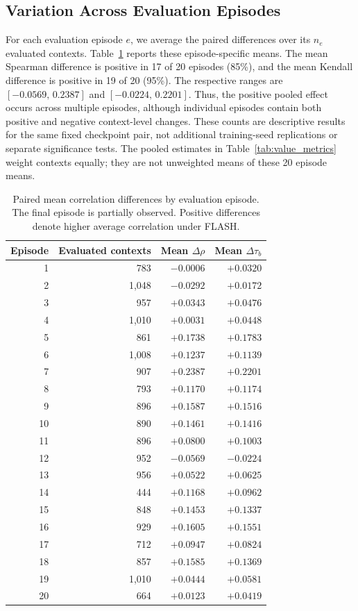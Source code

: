 \documentclass{article} %
\begin{document}
\subsection{Variation Across Evaluation Episodes}
For each evaluation episode $e$, we average the paired differences over its $n_e$ evaluated contexts. Table~\ref{tab:value_episode_changes} reports these episode-specific means. The mean Spearman difference is positive in 17 of 20 episodes (85\%), and the mean Kendall difference is positive in 19 of 20 (95\%). The respective ranges are $[-0.0569,\,0.2387]$ and $[-0.0224,\,0.2201]$. Thus, the positive pooled effect occurs across multiple episodes, although individual episodes contain both positive and negative context-level changes. These counts are descriptive results for the same fixed checkpoint pair, not additional training-seed replications or separate significance tests. The pooled estimates in Table~\ref{tab:value_metrics} weight contexts equally; they are not unweighted means of these 20 episode means.

\begin{table}[!t]
\centering
\small
\caption{Paired mean correlation differences by evaluation episode. The final episode is partially observed. Positive differences denote higher average correlation under FLASH.}
\label{tab:value_episode_changes}
\begin{tabular}{rrrr}
\toprule
Episode & Evaluated contexts & Mean $\Delta\rho$ & Mean $\Delta\tau_b$ \\
\midrule
1 & 783 & $-0.0006$ & $+0.0320$ \\
2 & 1,048 & $-0.0292$ & $+0.0172$ \\
3 & 957 & $+0.0343$ & $+0.0476$ \\
4 & 1,010 & $+0.0031$ & $+0.0448$ \\
5 & 861 & $+0.1738$ & $+0.1783$ \\
6 & 1,008 & $+0.1237$ & $+0.1139$ \\
7 & 907 & $+0.2387$ & $+0.2201$ \\
8 & 793 & $+0.1170$ & $+0.1174$ \\
9 & 896 & $+0.1587$ & $+0.1516$ \\
10 & 890 & $+0.1461$ & $+0.1416$ \\
11 & 896 & $+0.0800$ & $+0.1003$ \\
12 & 952 & $-0.0569$ & $-0.0224$ \\
13 & 956 & $+0.0522$ & $+0.0625$ \\
14 & 444 & $+0.1168$ & $+0.0962$ \\
15 & 848 & $+0.1453$ & $+0.1337$ \\
16 & 929 & $+0.1605$ & $+0.1551$ \\
17 & 712 & $+0.0947$ & $+0.0824$ \\
18 & 857 & $+0.1585$ & $+0.1369$ \\
19 & 1,010 & $+0.0444$ & $+0.0581$ \\
20 & 664 & $+0.0123$ & $+0.0419$ \\
\bottomrule
\end{tabular}
\end{table}
\end{document}

